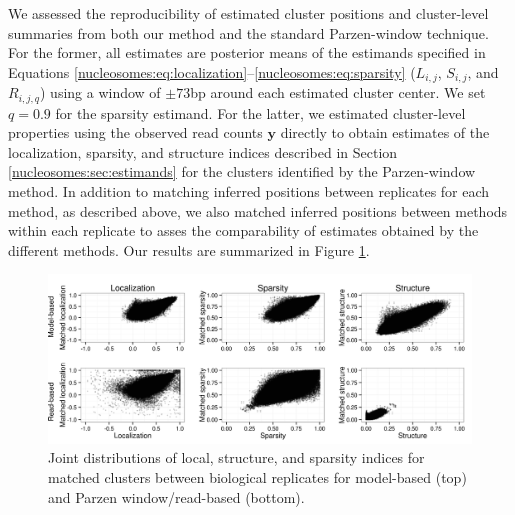 We assessed the reproducibility of estimated cluster positions and cluster-level summaries from both our method and the standard Parzen-window technique.
For the former, all estimates are posterior means of the estimands specified in Equations \ref{nucleosomes:eq:localization}--\ref{nucleosomes:eq:sparsity} ($L_{i,j}$, $S_{i,j}$, and $R_{i,j,q}$) using a window of $\pm73$bp around each estimated cluster center.
We set $q = 0.9$ for the sparsity estimand.
For the latter, we estimated cluster-level properties using the observed read counts $\bm y$ directly to obtain estimates of the localization, sparsity, and structure indices described in Section \ref{nucleosomes:sec:estimands} for the clusters identified by the Parzen-window method.
In addition to matching inferred positions between replicates for each method, as described above, we also matched inferred positions between methods within each replicate to asses the comparability of estimates obtained by the different methods.
Our results are summarized in Figure \ref{nucleosomes:fig:clusterReproducibility}.
%
\ifx\nofigures\undefined
\begin{figure}[t!]
\includegraphics[width=\textwidth]{figures/nucleosomes/figure_cluster_reproducibility_bio}
 \caption{Joint distributions of local, structure, and sparsity indices for matched clusters between biological replicates for model-based (top) and Parzen window/read-based (bottom). \label{nucleosomes:fig:clusterReproducibility}}
\end{figure}
\fi

